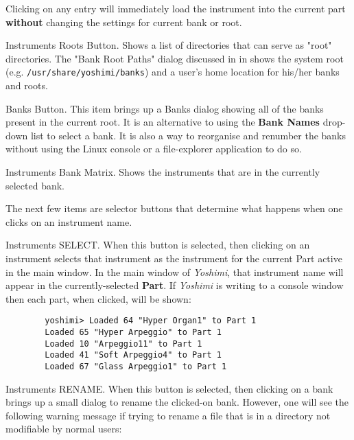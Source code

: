    Clicking on any entry will immediately load the instrument into the
   current part \textbf{without} changing the settings for current bank or
   root.

   Instruments Roots Button.
   Shows a list of directories that can serve as "root" directories.
   The "Bank Root Paths" dialog discussed in
   \hspace{4pt}in
   \hspace{4pt}shows
   the system root (e.g. \texttt{/usr/share/yoshimi/banks}) and
   a user's home location for his/her banks and roots.

   Banks Button.
   This item brings up a Banks dialog showing all of the banks present in the
   current root.
   It is an alternative to using the \textbf{Bank Names} drop-down list to
   select a bank.  It is also a way to reorganise and renumber the
   banks without using the Linux console or a file-explorer application to do
   so.

   Instruments Bank Matrix.
   Shows the instruments that are in the currently selected bank.

   The next few items are selector buttons that determine what happens when one
   clicks on an instrument name.

   Instruments SELECT.
   When this button is selected, then clicking on an instrument selects that
   instrument as the instrument for the current Part active in the main
   window.  In the main window of \textsl{Yoshimi}, that instrument name will
   appear in the currently-selected \textbf{Part}.  If \textsl{Yoshimi} is
   writing to a console window then each part, when clicked, will be shown:

   \begin{verbatim}
		yoshimi> Loaded 64 "Hyper Organ1" to Part 1
		Loaded 65 "Hyper Arpeggio" to Part 1
		Loaded 10 "Arpeggio11" to Part 1
		Loaded 41 "Soft Arpeggio4" to Part 1
		Loaded 67 "Glass Arpeggio1" to Part 1
   \end{verbatim}

   Instruments RENAME.
   When this button is selected, then clicking on a bank brings
   up a small dialog to rename the clicked-on bank.
   However, one will see the following warning message if trying to rename a
   file that is in a directory not modifiable by normal users:

